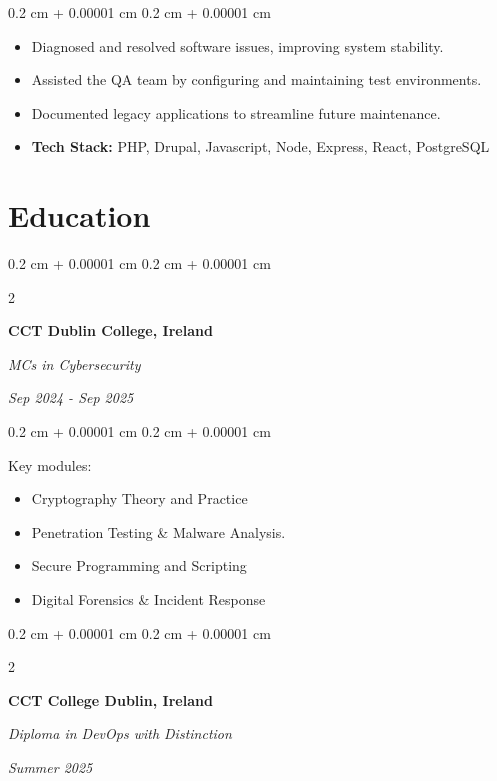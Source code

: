 \documentclass[10pt, letterpaper]{article}
\newenvironment{highlights}{
    \begin{itemize}[
        topsep=0.10 cm,
        parsep=0.10 cm,
        partopsep=0pt,
        itemsep=0pt,
        leftmargin=0.4 cm + 10pt
    ]
}{
    \end{itemize}
} %
\newenvironment{onecolentry}{
    \begin{adjustwidth}{
        0.2 cm + 0.00001 cm
    }{
        0.2 cm + 0.00001 cm
    }
}{
    \end{adjustwidth}
} %
\newenvironment{twocolentry}[2][]{
    \onecolentry
    \def\secondColumn{#2}
    \setcolumnwidth{\fill, 4.5 cm}
    \begin{paracol}{2}
}{
    \switchcolumn \raggedleft \secondColumn
    \end{paracol}
    \endonecolentry
} %
\begin{document}
        \vspace{0.10 cm}
        \begin{onecolentry}
            \begin{highlights}
                \item Diagnosed and resolved software issues, improving system stability.
                \item Assisted the QA team by configuring and maintaining test environments.
                \item Documented legacy applications to streamline future maintenance.
                \item \textbf{Tech Stack:} PHP, Drupal, Javascript, Node, Express, React, PostgreSQL
            \end{highlights}
        \end{onecolentry}



    \section{Education}


        \begin{twocolentry}{
        \textit{Sep 2024 - Sep 2025}}
            \textbf{CCT Dublin College, Ireland}

            \textit{MCs in Cybersecurity}
        \end{twocolentry}

        \vspace{0.10 cm}
        \begin{onecolentry}
        Key modules:
            \begin{highlights}
                \item Cryptography Theory and Practice
                \item Penetration Testing \& Malware Analysis.
                \item Secure Programming and Scripting
                \item Digital Forensics \& Incident Response
            \end{highlights}
        \end{onecolentry}

        \vspace{0.2 cm}


        \begin{twocolentry}{
        \textit{Summer 2025}}
            \textbf{CCT College Dublin, Ireland}

            \textit{Diploma in DevOps with Distinction}
        \end{twocolentry}
\end{document}
